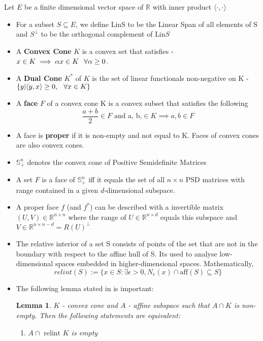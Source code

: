 \documentclass[twoside]{article}
\newtheorem{lemma}[theorem]{Lemma}
\begin{document}
\begin{multicols}{2}
Let $E$ be a finite dimensional vector space of $\mathbb{R}$ with inner product $\langle\cdot,\cdot\rangle$
\begin{itemize}
\item For a subset $S \subseteq E$, we define LinS to be the Linear Span of all elements of S and $S^\perp$ to be the orthogonal complement of $\mbox{Lin} S$
\item A \textbf{Convex Cone} $K$ is a convex set that satisfies - $x \in K \implies \alpha x \in K\hspace{0.1in} \forall \alpha \ge 0$. 
\item A \textbf{Dual Cone} $K^*$ of $K$ is the set of linear functionals non-negative on K - $\{y | \langle y,x\rangle \ge 0, \hspace{0.1in} \forall x \in K\}$ 
\item A \textbf{face} $F$ of a convex cone K is a convex subset that satisfies the following
\begin{equation*}
    \frac{a+b}{2} \in F \mbox{ and a, b,} \in K  \implies a,b \in F
\end{equation*}  
\item A face is \textbf{proper} if it is non-empty and not equal to K. Faces of convex cones are also convex cones. 
\item $\mathbb{S}^n_{+}$ denotes the convex cone of Positive Semidefinite Matrices
\item A set $F$ is a face of $\mathbb{S}^n_{+}$ iff it equals the set of all $n\times n$ PSD matrices with range contained in a given $d$-dimensional subspace. 
\item A proper face $f$ (and $f^*$) can be described with a invertible matrix $(U,V) \in \mathbb{R}^{n\times n}$ where the range of $U \in \mathbb{R}^{n\times d}$ equals this subspace and $V \in \mathbb{R}^{n\times n-d} = R(U)^{\perp}$
\item The relative interior of a set S consists of points of the set that are not in the boundary with respect to the affine hull of S. 
Its used to analyse low-dimensional spaces embedded in higher-dimensional spaces. 
Mathematically,
\begin{equation*}
    relint(S) := \{ x \in S : \exists \epsilon > 0, N_e(x) \cap \mbox{aff}(S) \subseteq S \}
\end{equation*}
\item The following lemma stated in \cite{permenter2014partial} is important: 
\begin{lemma} 
$K$ - convex cone and $A$ - affine subspace such that $A \cap K$ is non-empty. Then the following statements are equivalent: 
\begin{enumerate}
	\item $A \cap \mbox{ relint } K$ is empty 


\end{enumerate}
\end{lemma}
\end{itemize}
\end{multicols}
\end{document}
